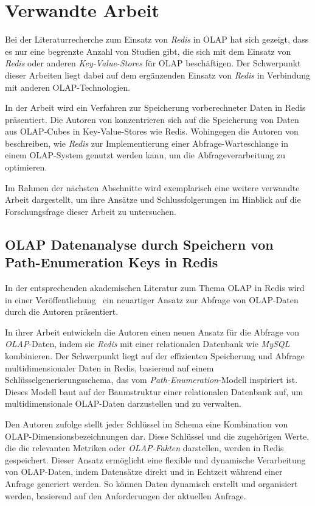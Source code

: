\section{Verwandte Arbeit}
Bei der Literaturrecherche zum Einsatz von \emph{Redis} in OLAP hat sich gezeigt, dass es nur eine begrenzte Anzahl von Studien gibt, die sich mit dem  Einsatz von \emph{Redis} oder anderen \emph{Key-Value-Stores} für OLAP beschäftigen. Der Schwerpunkt dieser Arbeiten liegt dabei auf dem ergänzenden Einsatz von \emph{Redis} in Verbindung mit anderen OLAP-Technologien.

In der Arbeit \cite{franciscus_answering_2017} wird ein Verfahren zur Speicherung vorberechneter Daten in Redis präsentiert. Die Autoren von \cite{zhao_multidimensional_2014} konzentrieren sich auf die Speicherung von Daten aus OLAP-Cubes in Key-Value-Stores wie Redis. Wohingegen die Autoren von \cite{ly_implementation_2017} beschreiben, wie \emph{Redis} zur Implementierung einer Abfrage-Warteschlange in einem OLAP-System genutzt werden kann, um die Abfrageverarbeitung zu optimieren.

Im Rahmen der nächsten Abschnitte wird exemplarisch eine weitere verwandte Arbeit dargestellt, um ihre Ansätze und Schlussfolgerungen im Hinblick auf die Forschungsfrage dieser Arbeit zu untersuchen.




\subsection{OLAP Datenanalyse durch Speichern von Path-Enumeration Keys in Redis}
In der entsprechenden akademischen Literatur zum Thema OLAP in Redis wird in einer Veröffentlichung~\cite{loyola_building_2012} ein neuartiger Ansatz zur Abfrage von OLAP-Daten durch die Autoren präsentiert.

In ihrer Arbeit entwickeln die Autoren einen neuen Ansatz für die Abfrage von \emph{OLAP}-Daten, indem sie \emph{Redis} mit einer relationalen Datenbank wie \emph{MySQL} kombinieren. Der Schwerpunkt liegt auf der effizienten Speicherung und Abfrage multidimensionaler Daten in Redis, basierend auf einem Schlüsselgenerierungsschema, das vom \emph{Path-Enumeration}-Modell inspiriert ist. Dieses Modell baut auf der Baumstruktur einer relationalen Datenbank auf, um multidimensionale OLAP-Daten darzustellen und zu verwalten.

Den Autoren zufolge stellt jeder Schlüssel im Schema eine Kombination von OLAP-Dimensionsbezeichnungen dar. Diese Schlüssel und die zugehörigen Werte, die die relevanten Metriken oder \emph{OLAP-Fakten} darstellen, werden in Redis gespeichert. Dieser Ansatz ermöglicht eine flexible und dynamische Verarbeitung von OLAP-Daten, indem Datensätze direkt und in Echtzeit während einer Anfrage generiert werden. So können Daten dynamisch erstellt und organisiert werden, basierend auf den Anforderungen der aktuellen Anfrage.


